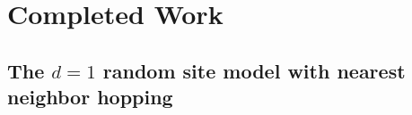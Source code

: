 \chapter{Completed Work}







\section{The $d=1$ random site model with nearest neighbor hopping}

